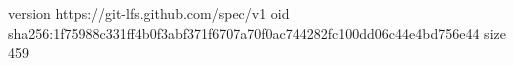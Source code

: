version https://git-lfs.github.com/spec/v1
oid sha256:1f75988c331ff4b0f3abf371f6707a70f0ac744282fc100dd06c44e4bd756e44
size 459
